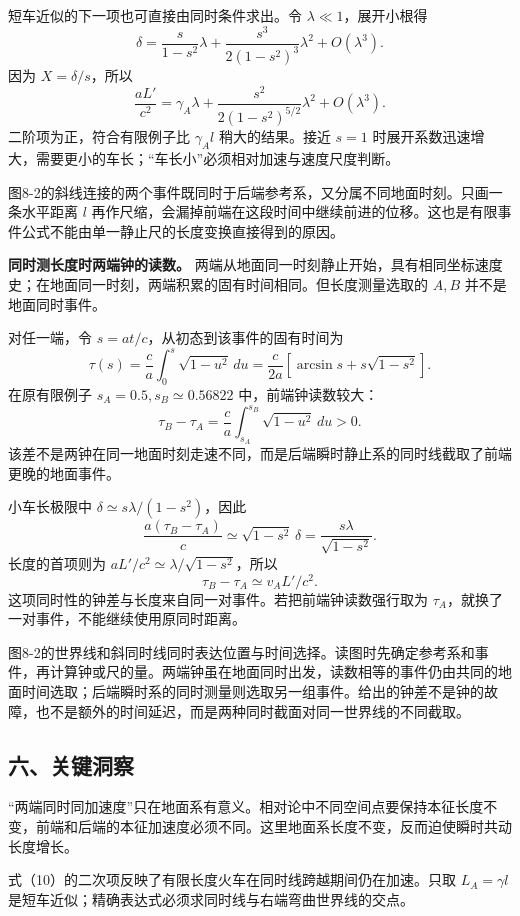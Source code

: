 \documentclass[12pt,a4paper,UTF8]{ctexart}
\begin{document}
短车近似的下一项也可直接由同时条件求出。令 \(\lambda\ll1\)，展开小根得
\[
\delta=\frac{s}{1-s^2}\lambda+
\frac{s^3}{2(1-s^2)^3}\lambda^2+O(\lambda^3).
\] 因为 \(X=\delta/s\)，所以 \[
\frac{aL'}{c^2}=\gamma_A\lambda+
\frac{s^2}{2(1-s^2)^{5/2}}\lambda^2+O(\lambda^3).
\] 二阶项为正，符合有限例子比 \(\gamma_A l\) 稍大的结果。接近 \(s=1\)
时展开系数迅速增大，需要更小的车长；``车长小''必须相对加速与速度尺度判断。

图8-2的斜线连接的两个事件既同时于后端参考系，又分属不同地面时刻。只画一条水平距离
\(l\)
再作尺缩，会漏掉前端在这段时间中继续前进的位移。这也是有限事件公式不能由单一静止尺的长度变换直接得到的原因。

\textbf{同时测长度时两端钟的读数。}
两端从地面同一时刻静止开始，具有相同坐标速度史；在地面同一时刻，两端积累的固有时间相同。但长度测量选取的
\(A,B\) 并不是地面同时事件。

对任一端，令 \(s=at/c\)，从初态到该事件的固有时间为 \[
\tau(s)=\frac ca\int_0^s\sqrt{1-u^2}\,du
=\frac{c}{2a}[\arcsin s+s\sqrt{1-s^2}].
\] 在原有限例子 \(s_A=0.5,s_B\simeq0.56822\) 中，前端钟读数较大： \[
\tau_B-\tau_A=\frac ca\int_{s_A}^{s_B}\sqrt{1-u^2}\,du>0.
\]
该差不是两钟在同一地面时刻走速不同，而是后端瞬时静止系的同时线截取了前端更晚的地面事件。

小车长极限中 \(\delta\simeq s\lambda/(1-s^2)\)，因此 \[
\frac{a(\tau_B-\tau_A)}c
\simeq\sqrt{1-s^2}\,\delta
=\frac{s\lambda}{\sqrt{1-s^2}}.
\] 长度的首项则为 \(aL'/c^2\simeq\lambda/\sqrt{1-s^2}\)，所以 \[
\tau_B-\tau_A\simeq v_A L'/c^2.
\] 这项同时性的钟差与长度来自同一对事件。若把前端钟读数强行取为
\(\tau_A\)，就换了一对事件，不能继续使用原同时距离。

图8-2的世界线和斜同时线同时表达位置与时间选择。读图时先确定参考系和事件，再计算钟或尺的量。两端钟虽在地面同时出发，读数相等的事件仍由共同的地面时间选取；后端瞬时系的同时测量则选取另一组事件。给出的钟差不是钟的故障，也不是额外的时间延迟，而是两种同时截面对同一世界线的不同截取。

\subsection{六、关键洞察}\label{ux516dux5173ux952eux6d1eux5bdf-7}

``两端同时同加速度''只在地面系有意义。相对论中不同空间点要保持本征长度不变，前端和后端的本征加速度必须不同。这里地面系长度不变，反而迫使瞬时共动长度增长。

式（10）的二次项反映了有限长度火车在同时线跨越期间仍在加速。只取
\(L_A=\gamma l\)
是短车近似；精确表达式必须求同时线与右端弯曲世界线的交点。
\end{document}
